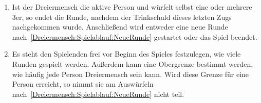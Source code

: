 \begin{enumerate}[label={(\arabic*)}]
	\item
	Ist der Dreiermensch die aktive Person und würfelt selbst eine oder mehrere 3er, so endet die Runde, nachdem der Trinkschuld dieses letzten Zugs nachgekommen wurde.
	Anschließend wird entweder eine neue Runde nach~\ref{Dreiermensch:Spielablauf:NeueRunde} gestartet oder das Spiel beendet.
	
	\item
	Es steht den Spielenden frei vor Beginn des Spieles festzulegen, wie viele Runden gespielt werden.
	Außerdem kann eine Obergrenze bestimmt werden, wie häufig jede Person Dreiermensch sein kann.
	Wird diese Grenze für eine Person erreicht, so nimmt sie am Auswürfeln nach~\ref{Dreiermensch:Spielablauf:NeueRunde} nicht teil.
\end{enumerate}
